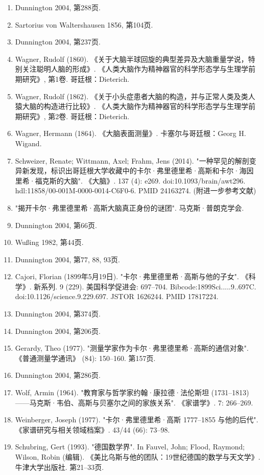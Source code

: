 \begin{enumerate}
\item Dunnington 2004, 第288页.  
\item Sartorius von Waltershausen 1856, 第104页.  
\item Dunnington 2004, 第237页.  
\item Wagner, Rudolf (1860). 《关于大脑半球回旋的典型差异及大脑重量学说，特别关注聪明人脑的形成》. 《人类大脑作为精神器官的科学形态学与生理学前期研究》, 第1卷. 哥廷根：Dieterich.  
\item Wagner, Rudolf (1862). 《关于小头症患者大脑的构造，并与正常人类及类人猿大脑的构造进行比较》. 《人类大脑作为精神器官的科学形态学与生理学前期研究》, 第2卷. 哥廷根：Dieterich.  
\item Wagner, Hermann (1864). 《大脑表面测量》. 卡塞尔与哥廷根：Georg H. Wigand.  
\item Schweizer, Renate; Wittmann, Axel; Frahm, Jens (2014). "一种罕见的解剖变异新发现，标识出哥廷根大学收藏中的卡尔·弗里德里希·高斯和卡尔·海因里希·福克斯的大脑". 《大脑》. 137 (4): e269. doi:10.1093/brain/awt296. hdl:11858/00-001M-0000-0014-C6F0-6. PMID 24163274. (附进一步参考文献)  
\item "揭开卡尔·弗里德里希·高斯大脑真正身份的谜团". 马克斯·普朗克学会.  
\item Dunnington 2004, 第66页.  
\item Wußing 1982, 第44页.  
\item Dunnington 2004, 第77, 88, 93页.  
\item Cajori, Florian (1899年5月19日). "卡尔·弗里德里希·高斯与他的子女". 《科学》. 新系列. 9 (229). 美国科学促进会: 697–704. Bibcode:1899Sci.....9..697C. doi:10.1126/science.9.229.697. JSTOR 1626244. PMID 17817224.  
\item Dunnington 2004, 第374页.  
\item Dunnington 2004, 第206页.  
\item Gerardy, Theo (1977). "测量学家作为卡尔·弗里德里希·高斯的通信对象". 《普通测量学通讯》 (84): 150–160. 第157页.  
\item Dunnington 2004, 第286页.  
\item Wolf, Armin (1964). "教育家与哲学家约翰·康拉德·法伦斯坦 (1731–1813)——马克斯·韦伯、高斯与贝塞尔之间的家族关系". 《家谱学》. 7: 266–269.  
\item Weinberger, Joseph (1977). "卡尔·弗里德里希·高斯 1777–1855 与他的后代". 《家谱研究与相关领域档案》. 43/44 (66): 73–98.  
\item Schubring, Gert (1993). "德国数学界". In Fauvel, John; Flood, Raymond; Wilson, Robin (编辑). 《美比乌斯与他的团队：19世纪德国的数学与天文学》. 牛津大学出版社. 第21–33页.  

\end{enumerate}
